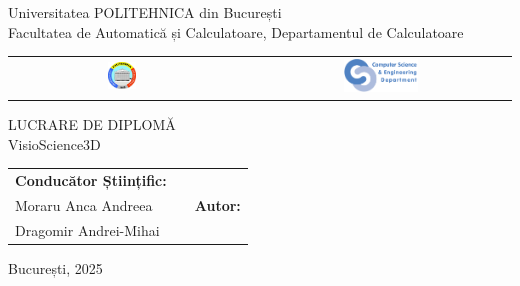 \begin{titlepage}
	\begin{center}
		{\Large Universitatea POLITEHNICA din București}\\[2mm]
		{\Large Facultatea de Automatică și Calculatoare, Departamentul de Calculatoare}\\[3mm]

		\begin{tabular}{ccc}
			\includegraphics[width=0.13\textwidth]{src/img/branding/upb} & \hspace{3cm} & \includegraphics[width=0.30\textwidth]{src/img/branding/cs}
		\end{tabular}

		\vspace*{35mm}
		{\Huge LUCRARE DE DIPLOMĂ}\\[15mm]
		{\Huge VisioScience3D}\\[35mm]

		\begin{tabular}{p{} c p{}}
			\raggedright \Large \textbf{Conducător Științific:} \\ \Large Moraru Anca Andreea
			& &
			\raggedleft \Large \textbf{Autor:} \\ \Large Dragomir Andrei-Mihai
		\end{tabular}

		\vspace*{40mm}
		\Large București, 2025
	\end{center}
\end{titlepage}
